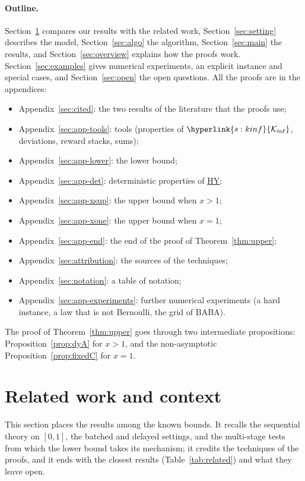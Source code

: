 \documentclass[10pt]{article}
\newcommand{\sy}[2]{{\hyperlink{#1}{#2}}}
\newcommand{\1}{\mathbf{1}}
\newcommand{\Ki}{\sy{s:kinf}{\mathcal K_{\inf}}}
\newcommand{\HY}{\hyperref[def:hy]{\textup{HY}}}
\begin{document}
\paragraph{Outline.} Section~\ref{sec:related} compares our results with the related work, Section~\ref{sec:setting} describes the model, Section~\ref{sec:algo} the algorithm, Section~\ref{sec:main} the results, and
Section~\ref{sec:overview} explains how the proofs work. Section~\ref{sec:examples} gives numerical experiments, an explicit instance and special cases, and Section~\ref{sec:open} the open
questions. All the proofs are in the appendices:
\begin{itemize}[leftmargin=*,nosep]
\item Appendix~\ref{sec:cited}: the two results of the literature that the proofs use;
\item Appendix~\ref{sec:app-tools}: tools (properties of $\Ki$, deviations, reward stacks, sums);
\item Appendix~\ref{sec:app-lower}: the lower bound;
\item Appendix~\ref{sec:app-det}: deterministic properties of \HY;
\item Appendix~\ref{sec:app-xsup}: the upper bound when $x>1$;
\item Appendix~\ref{sec:app-xone}: the upper bound when $x=1$;
\item Appendix~\ref{sec:app-end}: the end of the proof of Theorem~\ref{thm:upper};
\item Appendix~\ref{sec:attribution}: the sources of the techniques;
\item Appendix~\ref{sec:notation}: a table of notation;
\item Appendix~\ref{sec:app-experiments}: further numerical experiments (a hard instance, a law that is not Bernoulli, the grid of BABA).
\end{itemize}
The proof of Theorem~\ref{thm:upper} goes through two intermediate propositions: Proposition~\ref{prop:dyA} for $x>1$, and the non-asymptotic Proposition~\ref{prop:fixedC} for $x=1$.

\section{Related work and context}\label{sec:related}

This section places the results among the known bounds. It recalls the sequential theory on $[0,1]$, the batched and delayed settings, and
the multi-stage tests from which the lower bound takes its mechanism; it credits the techniques of the proofs, and it ends with the
closest results (Table~\ref{tab:related}) and what they leave open.
\end{document}
